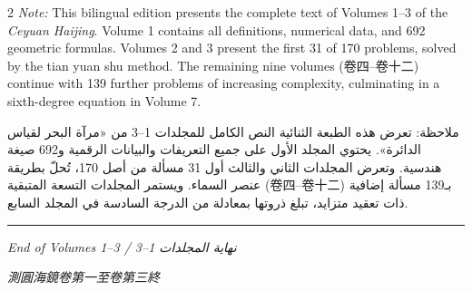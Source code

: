 \documentclass[11pt,a4paper]{article}
\newcommand{\ar}[1]{\arabicfont\beginR #1\endR}
\begin{document}
\vspace{0.5cm}

\begin{paracol}{2}
\textit{Note:} This bilingual edition presents the complete text of Volumes 1--3 of the \textit{Ceyuan Haijing}. Volume 1 contains all definitions, numerical data, and 692 geometric formulas. Volumes 2 and 3 present the first 31 of 170 problems, solved by the tian yuan shu method. The remaining nine volumes (卷四--卷十二) continue with 139 further problems of increasing complexity, culminating in a sixth-degree equation in Volume 7.

\switchcolumn

\ar{ملاحظة: تعرض هذه الطبعة الثنائية النص الكامل للمجلدات 1–3 من «مرآة البحر لقياس الدائرة». يحتوي المجلد الأول على جميع التعريفات والبيانات الرقمية و692 صيغة هندسية. وتعرض المجلدات الثاني والثالث أول 31 مسألة من أصل 170، تُحلّ بطريقة عنصر السماء. ويستمر المجلدات التسعة المتبقية (卷四–卷十二) بـ139 مسألة إضافية ذات تعقيد متزايد، تبلغ ذروتها بمعادلة من الدرجة السادسة في المجلد السابع.}

\end{paracol}

\vspace{1cm}

\begin{center}
{\color{rulecolor}\rule{0.4\textwidth}{0.4pt}}

\vspace{0.5cm}

{\small\color{sectioncolor}
\textit{End of Volumes 1--3 / \ar{نهاية المجلدات 1–3}}
}

\vspace{0.3cm}

{\footnotesize\color{notecolor}
\textit{測圓海鏡卷第一至卷第三終}
}
\end{center}
\end{document}
